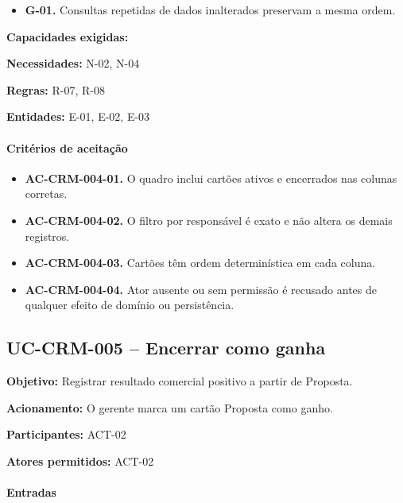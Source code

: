 \documentclass[10pt,a4paper]{article}
\begin{document}
\begin{itemize}

\item \textbf{G-01.} Consultas repetidas de dados inalterados preservam a mesma ordem.

\end{itemize}

\textbf{Capacidades exigidas:}

\textbf{Necessidades:} N-02, N-04

\textbf{Regras:} R-07, R-08

\textbf{Entidades:} E-01, E-02, E-03

\paragraph{Critérios de aceitação}

\begin{itemize}

\item \textbf{AC-CRM-004-01.} O quadro inclui cartões ativos e encerrados nas colunas corretas.

\item \textbf{AC-CRM-004-02.} O filtro por responsável é exato e não altera os demais registros.

\item \textbf{AC-CRM-004-03.} Cartões têm ordem determinística em cada coluna.

\item \textbf{AC-CRM-004-04.} Ator ausente ou sem permissão é recusado antes de qualquer efeito de domínio ou persistência.

\end{itemize}

\subsection{UC-CRM-005 -- Encerrar como ganha}

\textbf{Objetivo:} Registrar resultado comercial positivo a partir de Proposta.

\textbf{Acionamento:} O gerente marca um cartão Proposta como ganho.

\textbf{Participantes:} ACT-02

\textbf{Atores permitidos:} ACT-02

\paragraph{Entradas}
\end{document}
